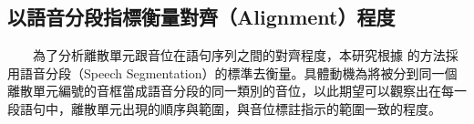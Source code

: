 \subsection{以語音分段指標衡量對齊（Alignment）程度}

　　為了分析離散單元跟音位在語句序列之間的對齊程度，本研究根據 \cite{strgar_phoneme_2023} 的方法採用語音分段（Speech Segmentation）的標準去衡量。具體動機為將被分到同一個離散單元編號的音框當成語音分段的同一類別的音位，以此期望可以觀察出在每一段語句中，離散單元出現的順序與範圍，與音位標註指示的範圍一致的程度。
